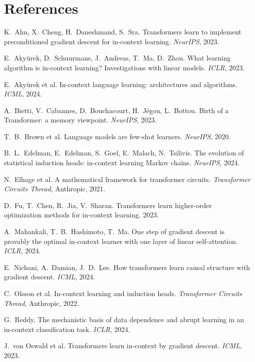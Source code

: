 \documentclass[12pt]{article}
\begin{document}
\section*{References}
\begin{enumerate}[label={[\arabic*]},leftmargin=2.4em]
\item K.~Ahn, X.~Cheng, H.~Daneshmand, S.~Sra. Transformers learn to implement preconditioned
gradient descent for in-context learning. \emph{NeurIPS}, 2023.
\item E.~Aky\"urek, D.~Schuurmans, J.~Andreas, T.~Ma, D.~Zhou. What learning algorithm is
in-context learning? Investigations with linear models. \emph{ICLR}, 2023.
\item E.~Aky\"urek et al. In-context language learning: architectures and algorithms.
\emph{ICML}, 2024.
\item A.~Bietti, V.~Cabannes, D.~Bouchacourt, H.~J\'egou, L.~Bottou. Birth of a Transformer: a
memory viewpoint. \emph{NeurIPS}, 2023.
\item T.~B.~Brown et al. Language models are few-shot learners. \emph{NeurIPS}, 2020.
\item B.~L.~Edelman, E.~Edelman, S.~Goel, E.~Malach, N.~Tsilivis. The evolution of statistical
induction heads: in-context learning Markov chains. \emph{NeurIPS}, 2024.
\item N.~Elhage et al. A mathematical framework for transformer circuits.
\emph{Transformer Circuits Thread}, Anthropic, 2021.
\item D.~Fu, T.~Chen, R.~Jia, V.~Sharan. Transformers learn higher-order optimization methods for
in-context learning. 2023.
\item A.~Mahankali, T.~B.~Hashimoto, T.~Ma. One step of gradient descent is provably the optimal
in-context learner with one layer of linear self-attention. \emph{ICLR}, 2024.
\item E.~Nichani, A.~Damian, J.~D.~Lee. How transformers learn causal structure with gradient
descent. \emph{ICML}, 2024.
\item C.~Olsson et al. In-context learning and induction heads.
\emph{Transformer Circuits Thread}, Anthropic, 2022.
\item G.~Reddy. The mechanistic basis of data dependence and abrupt learning in an in-context
classification task. \emph{ICLR}, 2024.
\item J.~von Oswald et al. Transformers learn in-context by gradient descent. \emph{ICML}, 2023.
\end{enumerate}
\end{document}
